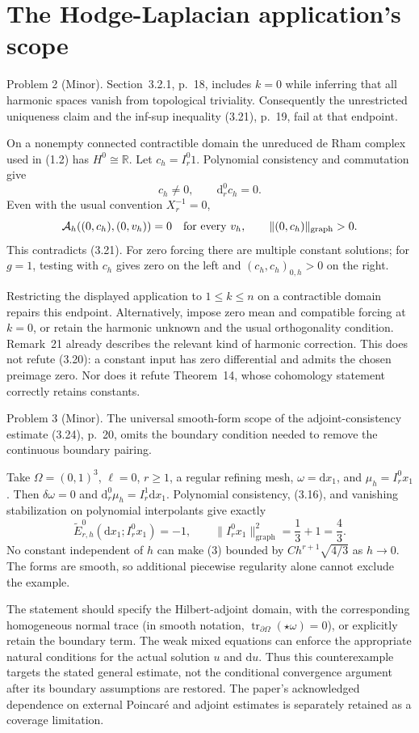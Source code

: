 \documentclass[10pt]{article}
\begin{document}
\section*{The Hodge-Laplacian application’s scope}
Problem 2 (Minor).  Section 3.2.1, p. 18, includes \(k=0\) while inferring that all harmonic spaces vanish from topological triviality. Consequently the unrestricted uniqueness claim and the inf-sup inequality (3.21), p. 19, fail at that endpoint.\par
On a nonempty connected contractible domain the unreduced de Rham complex used in (1.2) has \(H^0\cong\mathbb R\). Let \(c_h=I_r^0 1\). Polynomial consistency and commutation give \[c_h\ne0,\qquad \mathrm d_r^0c_h=0.\] Even with the usual convention \(X_r^{-1}=0\), \[\mathcal A_h((0,c_h),(0,v_h))=0
 \quad\hbox{for every }v_h,\qquad
 \lVert(0,c_h)\rVert_{\mathrm{graph}}>0.\] This contradicts (3.21). For zero forcing there are multiple constant solutions; for \(g=1\), testing with \(c_h\) gives zero on the left and \((c_h,c_h)_{0,h}>0\) on the right.\par
Restricting the displayed application to \(1\le k\le n\) on a contractible domain repairs this endpoint. Alternatively, impose zero mean and compatible forcing at \(k=0\), or retain the harmonic unknown and the usual orthogonality condition. Remark 21 already describes the relevant kind of harmonic correction. This does not refute (3.20): a constant input has zero differential and admits the chosen preimage zero. Nor does it refute Theorem 14, whose cohomology statement correctly retains constants.\par
Problem 3 (Minor).  The universal smooth-form scope of the adjoint-consistency estimate (3.24), p. 20, omits the boundary condition needed to remove the continuous boundary pairing.\par
Take \(\Omega=(0,1)^3\), \(\ell=0\), \(r\ge1\), a regular refining mesh, \(\omega=\mathrm dx_1\), and \(\mu_h=I_r^0x_1\). Then \(\delta\omega=0\) and \(\mathrm d_r^0\mu_h=I_r^1\mathrm dx_1\). Polynomial consistency, (3.16), and vanishing stabilization on polynomial interpolants give exactly \[\widetilde E_{r,h}^0(\mathrm dx_1;I_r^0x_1)=-1,\qquad
 \lVert I_r^0x_1\rVert_{\mathrm{graph}}^2=\frac13+1=\frac43. \tag{3}\] No constant independent of \(h\) can make (3) bounded by \(Ch^{r+1}\sqrt{4/3}\) as \(h\to0\). The forms are smooth, so additional piecewise regularity alone cannot exclude the example.\par
The statement should specify the Hilbert-adjoint domain, with the corresponding homogeneous normal trace (in smooth notation, \(\operatorname{tr}_{\partial\Omega}(\star\omega)=0\)), or explicitly retain the boundary term. The weak mixed equations can enforce the appropriate natural conditions for the actual solution \(u\) and \(\mathrm du\). Thus this counterexample targets the stated general estimate, not the conditional convergence argument after its boundary assumptions are restored. The paper’s acknowledged dependence on external Poincaré and adjoint estimates is separately retained as a coverage limitation.\par
\end{document}
